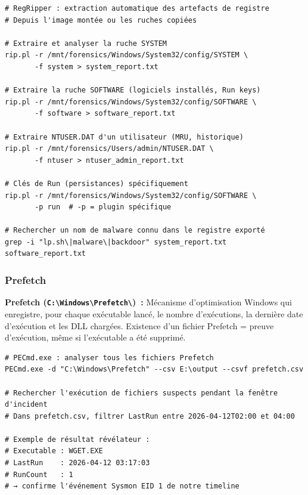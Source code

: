\begin{lstlisting}[style=StyleTerminal,
  caption={Analyse de registre avec RegRipper},
  label={lst:registry-forensics}]
# RegRipper : extraction automatique des artefacts de registre
# Depuis l'image montée ou les ruches copiées

# Extraire et analyser la ruche SYSTEM
rip.pl -r /mnt/forensics/Windows/System32/config/SYSTEM \
       -f system > system_report.txt

# Extraire la ruche SOFTWARE (logiciels installés, Run keys)
rip.pl -r /mnt/forensics/Windows/System32/config/SOFTWARE \
       -f software > software_report.txt

# Extraire NTUSER.DAT d'un utilisateur (MRU, historique)
rip.pl -r /mnt/forensics/Users/admin/NTUSER.DAT \
       -f ntuser > ntuser_admin_report.txt

# Clés de Run (persistances) spécifiquement
rip.pl -r /mnt/forensics/Windows/System32/config/SOFTWARE \
       -p run  # -p = plugin spécifique

# Rechercher un nom de malware connu dans le registre exporté
grep -i "lp.sh\|malware\|backdoor" system_report.txt software_report.txt
\end{lstlisting}

\subsubsection{Prefetch}

\begin{boxdef}
\textbf{Prefetch (\texttt{C:\textbackslash Windows\textbackslash Prefetch\textbackslash})~:}
Mécanisme d'optimisation Windows qui enregistre, pour chaque exécutable lancé,
le nombre d'exécutions, la dernière date d'exécution et les DLL chargées.
Existence d'un fichier Prefetch = preuve d'exécution, même si l'exécutable
a été supprimé.
\end{boxdef}

\begin{lstlisting}[style=StyleTerminal,
  caption={Analyse Prefetch avec PECmd (Eric Zimmermann)},
  label={lst:prefetch}]
# PECmd.exe : analyser tous les fichiers Prefetch
PECmd.exe -d "C:\Windows\Prefetch" --csv E:\output --csvf prefetch.csv

# Rechercher l'exécution de fichiers suspects pendant la fenêtre d'incident
# Dans prefetch.csv, filtrer LastRun entre 2026-04-12T02:00 et 04:00

# Exemple de résultat révélateur :
# Executable : WGET.EXE
# LastRun    : 2026-04-12 03:17:03
# RunCount   : 1
# → confirme l'événement Sysmon EID 1 de notre timeline
\end{lstlisting}


